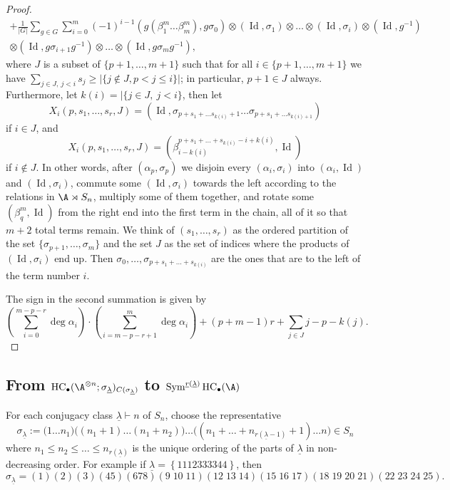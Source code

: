 \documentclass[12pt,a4paper,reqno]{amsart}
\DeclareMathOperator{\id}{Id}
\DeclareMathOperator{\hochcx}{{HC}}
\DeclareMathOperator\Sym{Sym}
\begin{document}
\begin{proof}
\begin{multline*}
+\frac{1}{|G|}\sum\limits_{g\in G}\sum\limits_{i=0}^m
(-1)^{i-1}
(g(\beta_1^m\ldots\beta_m^m), g\sigma_0)\otimes (\id,\sigma_1) \otimes \ldots \otimes (\id,\sigma_i)
\otimes (\id, g^{-1}) 
\\
\otimes (\id, g\sigma_{i+1}g^{-1})\otimes \ldots \otimes (\id, g\sigma_mg^{-1}),
\end{multline*}
where
$J$ is a subset of $\{p+1,\ldots, m+1\}$ such that for all $i\in \{p+1,\ldots, m+1\}$
we have $\sum_{j\in J,\ j<i} s_j  \geq |\{j\notin J, p<j\leq i\}|$; in particular, $p+1\in J$ always.
Furthermore, let $k(i)=|\{j\in J,\ j<i\}$, then let
$$
X_i(p,s_1,\ldots, s_r,J)=(\id, \sigma_{p+s_1+\ldots s_{k(i)}+1}\ldots\sigma_{p+s_1+\ldots s_{k(i)+1}})
$$
if $i\in J$, and
$$
X_i(p,s_1,\ldots, s_r, J) = (\beta_{i-k(i)}^{p+s_1+\ldots + s_{k(i)}-i+k(i)}, \id)
$$
if $i\notin J$.
In other words, after $(\alpha_p, \sigma_p)$ we disjoin every $(\alpha_i, \sigma_i)$ into
$(\alpha_i, \id)$ and $(\id, \sigma_i)$, commute some $(\id, \sigma_i)$ towards the left
according to the relations in $\A\rtimes S_n$,
multiply some of them together, and rotate some $(\beta_q^m,\id)$ from the right end
into the first term in the chain, all of it so that $m+2$ total terms remain.
We think of $(s_1,\ldots, s_r)$ as the ordered partition of the set $\{\sigma_{p+1},\ldots, \sigma_m\}$ and
the set $J$ as the set of indices where the products of $(\id, \sigma_i)$ end up.
Then $\sigma_0, \ldots, \sigma_{p+s_1+\ldots+s_{k(i)}}$ are the ones that are to the left of the term number $i$.

The sign in the second summation is given by
\begin{equation}
\label{eqn-sign-main-homotopy-xinu-id}
\left(\sum\limits_{i=0}^{m-p-r} \deg\alpha_i\right)\cdot 
\left(\sum\limits_{i=m-p-r+1}^m \deg\alpha_i\right)
+(p+m-1)r
+\sum\limits_{j\in J} j-p-k(j).
\end{equation}
\end{proof}

\subsection{From $\hochcx_\bullet(\A^{\otimes
n};\sigma_{\underline{\lambda}})_{C(\sigma_{\underline{\lambda}})}$ 
to $\Sym^{\underline{r}(\underline{\lambda})}\hochcx_\bullet(\A)$}
\label{section-from-underline-n-twisted-hh-to-sym-underline-n-hh}

For each conjugacy class $\underline{\lambda} \vdash n$ of $S_n$, choose
the representative 
$$ \sigma_{\underline{\lambda}} := \bigl(1\dots n_1\bigr) 
\bigl((n_1+1) \dots (n_1 + n_2) \bigr) \dots \bigl( (n_1 + \dots +
n_{r(\underline{\lambda}-1)} + 1) \dots n \bigr) \in S_n $$
where $n_1 \leq n_2 \leq \dots \leq n_{r(\underline{\lambda})}$ is the 
unique ordering of the parts of $\underline{\lambda}$ in non-decreasing
order. For example if $\underline{\lambda} = \left\{ 
1 1 1 2 3 3 3 3 4 4 \right\}$, then 
$$ \sigma_{\underline{\lambda}} = (1) (2) (3) (45) (678) (9\;10\;11) (12\;
13\; 14) (15\; 16\; 17) (18\; 19\; 20\; 21) (22\; 23\; 24\; 25). $$
\end{document}
